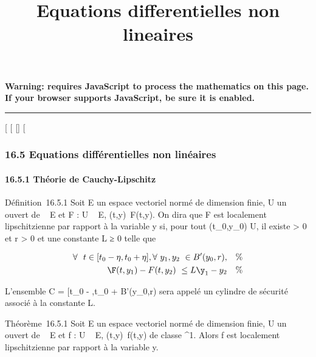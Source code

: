 \documentclass[]{article}
\title{Equations differentielles non lineaires}
\author{}
\date{}
\begin{document}
\maketitle

\textbf{Warning: 
requires JavaScript to process the mathematics on this page.\\ If your
browser supports JavaScript, be sure it is enabled.}

\begin{center}\rule{3in}{0.4pt}\end{center}

{[}
{[}
{[}{]}
{[}

\subsubsection{16.5 Equations différentielles non linéaires}

\paragraph{16.5.1 Théorie de Cauchy-Lipschitz}

Définition~16.5.1 Soit E un espace vectoriel normé de dimension finie, U
un ouvert de ~ \times E et F : U \rightarrow~ E,
(t,y)\mapsto~F(t,y). On dira que F est localement
lipschitzienne par rapport à la variable y si, pour tout
(t_0,y_0) \in U, il existe \eta \textgreater{} 0 et r
\textgreater{} 0 et une constante L ≥ 0 telle que

\begin{align*} \forall~~t \in
{[}t_0 - \eta,t_0 + \eta{]},
\forall~y_1,y_2~ \in
B'(y_0,r),& & \%& \\
\F(t,y_1) -
F(t,y_2)\ \leq
L\y_1 -
y_2& & \%&
\\ \end{align*}

L'ensemble C = {[}t_0 - \eta,t_0 + \eta{]} \times
B'(y_0,r) sera appelé un cylindre de sécurité associé à la
constante L.

Théorème~16.5.1 Soit E un espace vectoriel normé de dimension finie, U
un ouvert de ~ \times E et f : U \rightarrow~ E, (t,y)\mapsto~f(t,y)
de classe ^1. Alors f est localement lipschitzienne par
rapport à la variable y.
\end{document}
